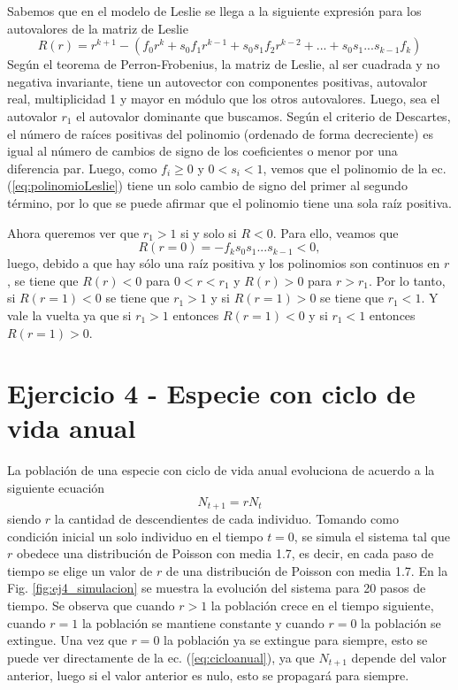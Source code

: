 \documentclass[letterpaper,12pt]{article}
\theoremstyle{plain}
\begin{document}
Sabemos que en el modelo de Leslie se llega a la siguiente expresión para los autovalores de la matriz de Leslie 
\begin{equation}
    R(r) = r^{k+1} - (f_0r^{k} + s_0f_1r^{k-1} + s_0s_1f_2r^{k-2} + ... + s_0s_1 ... s_{k-1}f_{k})
    \label{eq:polinomioLeslie}
\end{equation}
Según el teorema de Perron-Frobenius, la matriz de Leslie, al ser cuadrada y no negativa invariante, tiene un autovector con componentes positivas, autovalor real, multiplicidad 1 y mayor en módulo que los otros autovalores. Luego, sea el autovalor $r_1$ el autovalor dominante que buscamos. 
Según el criterio de Descartes, el número de raíces positivas del polinomio (ordenado de forma decreciente) es igual al número de cambios de signo de los coeficientes o menor por una diferencia par. Luego, como $f_i\geq0$ y $0<s_i<1$, vemos que el polinomio de la ec. (\ref*{eq:polinomioLeslie}) tiene un solo cambio de signo del primer al segundo término, por lo que se puede afirmar que el polinomio tiene una sola raíz positiva.

Ahora queremos ver que $r_1>1$ si y solo si $R<0$. Para ello, veamos que 
\begin{equation}
    R(r=0) = - f_k s_0 s_1... s_{k-1} < 0,
\end{equation}
luego, debido a que hay sólo una raíz positiva y los polinomios son continuos en $r$, se tiene que $R(r)<0$ para $0<r<r_1$ y $R(r)>0$ para $r>r_1$. Por lo tanto, si $R(r=1)<0$ se tiene que $r_1>1$ y si $R(r=1)>0$ se tiene que $r_1<1$. Y vale la vuelta ya que si $r_1>1$ entonces $R(r=1)<0$ y si $r_1<1$ entonces $R(r=1)>0$.

\section*{Ejercicio 4 - Especie con ciclo de vida anual}

La población de una especie con ciclo de vida anual evoluciona de acuerdo a la siguiente ecuación 
\begin{equation}
    N_{t+1} = r N_t
    \label{eq:cicloanual}
\end{equation}    
siendo $r$ la cantidad de descendientes de cada individuo. Tomando como condición inicial un solo individuo en el tiempo $t=0$, se simula el sistema tal que $r$ obedece una distribución de Poisson con media 1.7, es decir, en cada paso de tiempo se elige un valor de $r$ de una distribución de Poisson con media 1.7. En la Fig. \ref*{fig:ej4_simulacion} se muestra la evolución del sistema para 20 pasos de tiempo. Se observa que cuando $r>1$ la población crece en el tiempo siguiente, cuando $r=1$ la población se mantiene constante y cuando $r=0$ la población se extingue. Una vez que $r=0$ la población ya se extingue para siempre, esto se puede ver directamente de la ec. (\ref*{eq:cicloanual}), ya que $N_{t+1}$ depende del valor anterior, luego si el valor anterior es nulo, esto se propagará para siempre.
\end{document}
